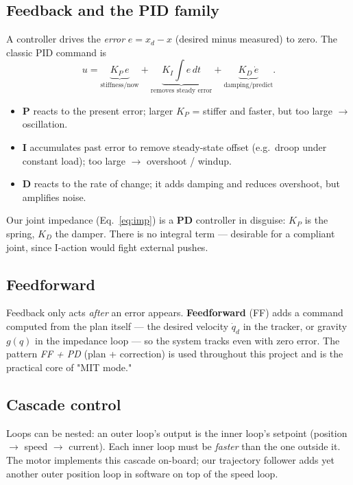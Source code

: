 \documentclass[11pt,a4paper]{article}
\begin{document}
\subsection{Feedback and the PID family}
A controller drives the \emph{error} $e = x_d - x$ (desired minus measured) to
zero. The classic PID command is
\begin{equation}
  u = \underbrace{K_P\,e}_{\text{stiffness/now}}
    + \underbrace{K_I\!\int e\,dt}_{\text{removes steady error}}
    + \underbrace{K_D\,\dot e}_{\text{damping/predict}} .
\end{equation}
\begin{itemize}[nosep]
  \item \textbf{P} reacts to the present error; larger $K_P$ = stiffer and
        faster, but too large $\to$ oscillation.
  \item \textbf{I} accumulates past error to remove steady-state offset (e.g.\
        droop under constant load); too large $\to$ overshoot / windup.
  \item \textbf{D} reacts to the rate of change; it adds damping and reduces
        overshoot, but amplifies noise.
\end{itemize}
Our joint impedance (Eq.~\eqref{eq:imp}) is a \textbf{PD} controller in disguise:
$K_P$ is the spring, $K_D$ the damper. There is no integral term --- desirable
for a compliant joint, since I-action would fight external pushes.

\subsection{Feedforward}
Feedback only acts \emph{after} an error appears. \textbf{Feedforward} (FF) adds a
command computed from the plan itself --- the desired velocity $\dot q_d$ in the
tracker, or gravity $g(q)$ in the impedance loop --- so the system tracks even
with zero error. The pattern \emph{FF + PD} (plan + correction) is used
throughout this project and is the practical core of "MIT mode."

\subsection{Cascade control}
Loops can be nested: an outer loop's output is the inner loop's setpoint
(position $\to$ speed $\to$ current). Each inner loop must be \emph{faster} than
the one outside it. The motor implements this cascade on-board; our trajectory
follower adds yet another outer position loop in software on top of the speed
loop.
\end{document}
